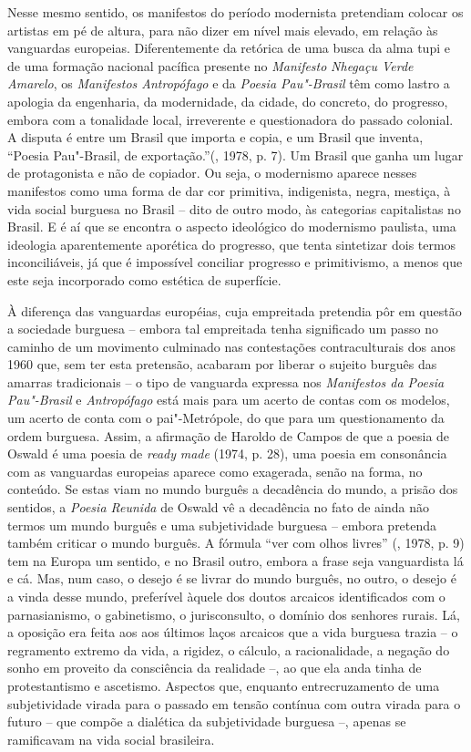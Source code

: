 {Nesse mesmo sentido, os manifestos do período modernista pretendiam
colocar os artistas em pé de altura, para não dizer em nível mais
elevado, em relação às vanguardas europeias. Diferentemente da retórica
de uma busca da alma tupi e de uma formação nacional pacífica presente
no \emph{Manifesto} \emph{Nhegaçu Verde Amarelo}, os \emph{Manifestos
Antropófago} e da \emph{Poesia Pau"-Brasil} têm como lastro a apologia da
engenharia, da modernidade, da cidade, do concreto, do progresso, embora
com a tonalidade local, irreverente e questionadora do passado colonial.
A disputa é entre um Brasil que importa e copia, e um Brasil que
inventa, ``Poesia Pau"-Brasil, de exportação.''(, 1978, p. 7). Um
Brasil que ganha um lugar de protagonista e não de copiador. Ou seja, o
modernismo aparece nesses manifestos como uma forma de dar cor
primitiva, indigenista, negra, mestiça, à vida social burguesa no Brasil
-- dito de outro modo, às categorias capitalistas no Brasil. E é aí que
se encontra o aspecto ideológico do modernismo paulista, uma ideologia
aparentemente aporética do progresso, que tenta sintetizar dois termos
inconciliáveis, já que é impossível conciliar progresso e primitivismo,
a menos que este seja incorporado como estética de superfície.

À diferença das vanguardas européias, cuja empreitada pretendia pôr em
questão a sociedade burguesa -- embora tal empreitada tenha significado
um passo no caminho de um movimento culminado nas contestações
contraculturais dos anos 1960 que, sem ter esta pretensão, acabaram por
liberar o sujeito burguês das amarras tradicionais -- o tipo de
vanguarda expressa nos \emph{Manifestos da Poesia Pau"-Brasil} e
\emph{Antropófago} está mais para um acerto de contas com os modelos, um
acerto de conta com o pai"-Metrópole, do que para um questionamento da
ordem burguesa. Assim, a afirmação de Haroldo de Campos de que a poesia
de Oswald é uma poesia de \emph{ready} \emph{made} (1974, p. 28), uma
poesia em consonância com as vanguardas europeias aparece como
exagerada, senão na forma, no conteúdo. Se estas viam no mundo burguês a
decadência do mundo, a prisão dos sentidos, a \emph{Poesia Reunida} de
Oswald vê a decadência no fato de ainda não termos um mundo burguês e
uma subjetividade burguesa -- embora pretenda também criticar o mundo
burguês. A fórmula ``ver com olhos livres'' (, 1978, p. 9)
tem na Europa um sentido, e no Brasil outro, embora a frase seja
vanguardista lá e cá. Mas, num caso, o desejo é se livrar do mundo
burguês, no outro, o desejo é a vinda desse mundo, preferível àquele dos
doutos arcaicos identificados com o parnasianismo, o gabinetismo, o
jurisconsulto, o domínio dos senhores rurais. Lá, a oposição era feita
aos aos últimos laços arcaicos que a vida burguesa trazia -- o
regramento extremo da vida, a rigidez, o cálculo, a racionalidade, a
negação do sonho em proveito da consciência da realidade --, ao que ela
anda tinha de protestantismo e ascetismo. Aspectos que, enquanto
entrecruzamento de uma subjetividade virada para o passado em tensão
contínua com outra virada para o futuro -- que compõe a dialética da
subjetividade burguesa --, apenas se ramificavam na vida social
brasileira.

}
